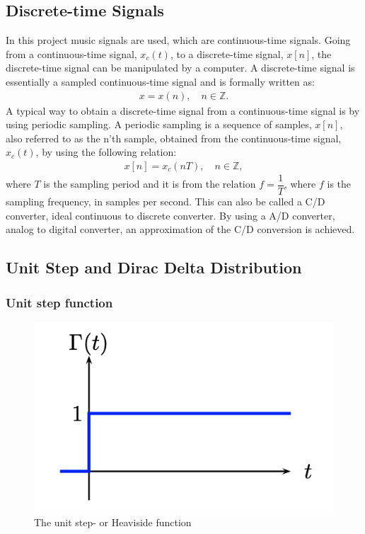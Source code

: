 \subsection{Discrete-time Signals} 
In this project music signals are used, which are continuous-time signals. Going from a continuous-time signal, $x_c(t)$, to a discrete-time signal, $x[n]$, the discrete-time signal can be manipulated by a computer. A discrete-time signal is essentially a sampled continuous-time signal and is formally written as:
\begin{align*}
    x={x(n)}, \quad    n \in \mathbb{Z}.
\end{align*}
A typical way to obtain a discrete-time signal from a continuous-time signal is by using periodic sampling. A periodic sampling is a sequence of samples, $x[n]$, also referred to as the n'th sample, obtained from the continuous-time signal, $x_c(t)$, by using the following relation:
\begin{align*}
x[n]=x_c (nT), \quad   n \in \mathbb{Z},
\end{align*}
where $T$ is the sampling period and it is from the relation $f=\dfrac{1}{T}$, where $f$ is the sampling frequency, in samples per second. This can also be called a C/D converter, ideal continuous to discrete converter. 
By using a A/D converter, analog to digital converter, an approximation of the C/D conversion is achieved. \cite[p. 140-142]{DiscreteTimeSignal}\\

\subsection{Unit Step and Dirac Delta Distribution}
\subsubsection{Unit step function}
\begin{figure}[H]
    \centering
    \includegraphics[scale=0.6]{figures/unit_step_func.png}
    \caption{The unit step- or Heaviside function}
    \label{fig:unit_step_function}
\end{figure}

